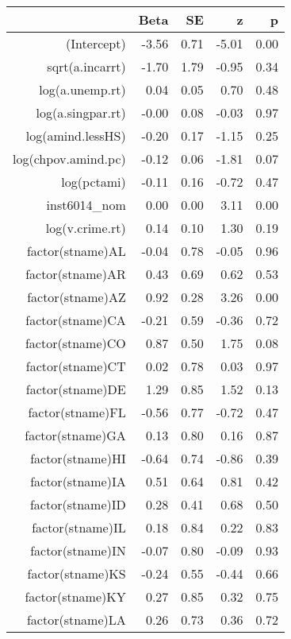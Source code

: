 \begin{table}[ht]
\centering
\begin{tabular}{rrrrr}
  \hline
 & Beta & SE & z & p \\ 
  \hline
(Intercept) & -3.56 & 0.71 & -5.01 & 0.00 \\ 
  sqrt(a.incarrt) & -1.70 & 1.79 & -0.95 & 0.34 \\ 
  log(a.unemp.rt) & 0.04 & 0.05 & 0.70 & 0.48 \\ 
  log(a.singpar.rt) & -0.00 & 0.08 & -0.03 & 0.97 \\ 
  log(amind.lessHS) & -0.20 & 0.17 & -1.15 & 0.25 \\ 
  log(chpov.amind.pc) & -0.12 & 0.06 & -1.81 & 0.07 \\ 
  log(pctami) & -0.11 & 0.16 & -0.72 & 0.47 \\ 
  inst6014\_nom & 0.00 & 0.00 & 3.11 & 0.00 \\ 
  log(v.crime.rt) & 0.14 & 0.10 & 1.30 & 0.19 \\ 
  factor(stname)AL & -0.04 & 0.78 & -0.05 & 0.96 \\ 
  factor(stname)AR & 0.43 & 0.69 & 0.62 & 0.53 \\ 
  factor(stname)AZ & 0.92 & 0.28 & 3.26 & 0.00 \\ 
  factor(stname)CA & -0.21 & 0.59 & -0.36 & 0.72 \\ 
  factor(stname)CO & 0.87 & 0.50 & 1.75 & 0.08 \\ 
  factor(stname)CT & 0.02 & 0.78 & 0.03 & 0.97 \\ 
  factor(stname)DE & 1.29 & 0.85 & 1.52 & 0.13 \\ 
  factor(stname)FL & -0.56 & 0.77 & -0.72 & 0.47 \\ 
  factor(stname)GA & 0.13 & 0.80 & 0.16 & 0.87 \\ 
  factor(stname)HI & -0.64 & 0.74 & -0.86 & 0.39 \\ 
  factor(stname)IA & 0.51 & 0.64 & 0.81 & 0.42 \\ 
  factor(stname)ID & 0.28 & 0.41 & 0.68 & 0.50 \\ 
  factor(stname)IL & 0.18 & 0.84 & 0.22 & 0.83 \\ 
  factor(stname)IN & -0.07 & 0.80 & -0.09 & 0.93 \\ 
  factor(stname)KS & -0.24 & 0.55 & -0.44 & 0.66 \\ 
  factor(stname)KY & 0.27 & 0.85 & 0.32 & 0.75 \\ 
  factor(stname)LA & 0.26 & 0.73 & 0.36 & 0.72 \\ 

\end{tabular}
\end{table}
